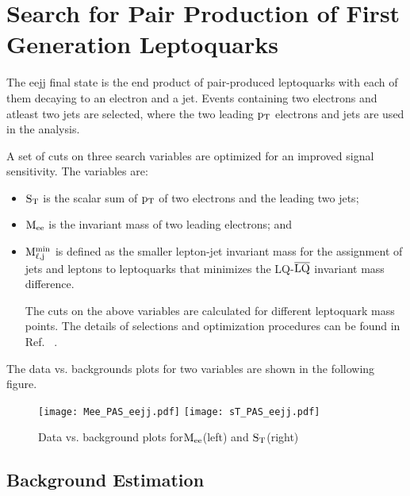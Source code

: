 \newpage
\section{Search for Pair Production of First Generation Leptoquarks}

The eejj final state is the end product of pair-produced leptoquarks with each of them decaying to an electron and a jet. Events containing  two electrons and atleast two jets are selected, where the two leading $\rm p_{T}$ electrons and jets are used in the analysis.

A set  of cuts on three search variables are optimized for an improved signal sensitivity. The variables are:



\begin{itemize}
\item $\rm S_{T}$ is the scalar sum of $\rm p_{T}$ of two electrons and the leading two jets;

\item $\rm M_{ee}$ is the invariant mass of two leading electrons; and

\item $\rm M_{\ell ,j}^{min}$ is defined as the smaller lepton-jet invariant mass for the assignment of jets and leptons to leptoquarks that minimizes the LQ-$\rm \overline{LQ}$ invariant mass difference.


The cuts on the above variables are calculated for different leptoquark mass points. The details of selections and optimization procedures can be found  in Ref. ~\cite{CMS-PAS-EXO-16-043}.



\end{itemize}

The data vs. backgrounds plots for two variables are shown in the following figure.
\begin{figure}[h]
\centering
\texttt{[image: Mee\_PAS\_eejj.pdf]}
\texttt{[image: sT\_PAS\_eejj.pdf]}
\caption{\label{figure:LimitLQ12016}Data vs. background plots for$\rm M_{ee}$(left) and $\rm S_{T}$(right) }
\end{figure}


\subsection{Background Estimation}

